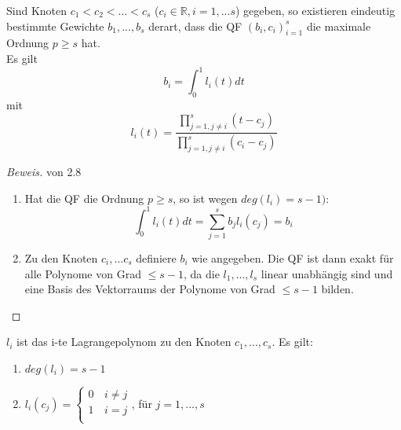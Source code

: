 \begin{theorem}
Sind Knoten $c_1 < c_2 < ... < c_s$ ($c_i \in \mathbb{R}, i = 1,...s$) gegeben, so existieren eindeutig bestimmte Gewichte $b_1 ,..., b_s$ derart, dass die QF $(b_i, c_i)_{i=1}^s$ die maximale Ordnung $p \geq s$ hat. \\
Es gilt $$b_i = \int_0^1 l_i(t) dt$$ mit $$l_i(t) = \frac{\prod_{j=1, j\neq i}^s (t-c_j)}{\prod_{j=1, j\neq i}^s (c_i-c_j)}$$

\begin{proof}[Beweis] von 2.8 \\
\begin{enumerate}
  \item Hat die QF die Ordnung $p \geq s$, so ist wegen $deg(l_i) = s-1)$:
  $$ \int_0^1 l_i(t) dt = \sum_{j=1}^s b_j l_i(c_j) = b_i$$
  \item Zu den Knoten $c_i, ...c_s$ definiere $b_i$ wie angegeben. Die QF ist dann exakt für alle Polynome von Grad $ \leq s-1$, da die $l_1, ...,l_s$ linear unabhängig sind und eine Basis des Vektorraums der Polynome von Grad $\leq s-1$ bilden.
\end{enumerate}
\end{proof}
\end{theorem}

\begin{comment*}[zu Satz (2.8)]
$l_i$ ist das i-te Lagrangepolynom zu den Knoten $c_1, ...,c_s$. Es gilt:
\begin{enumerate}
  \item $deg(l_i) = s-1$
  \item $l_i(c_j) = \left\{
\begin{array}{ll}
0 & \,i \neq j \\
1 & \, i = j\\
\end{array}
\right. $, für $j=1,...,s$
\end{enumerate}

\end{comment*}
